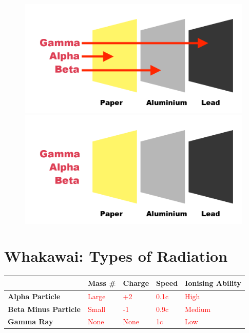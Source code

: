 \documentclass[12pt]{report}
\makeatletter
\DeclareRobustCommand{\fillinspace}[1]{%
	\ifthenelse
	{\boolean{@answer}}{\textcolor{red}{#1}}
	{\phantom{#1}}%
}
\makeatother
\begin{document}
\begin{figure}[ht]
	\centering
	{\includegraphics[width=0.9\linewidth]{radiation-penetration-answer.png}}
	{\includegraphics[width=0.9\linewidth]{radiation-penetration.png}}
\end{figure}

\section{Whakawai: Types of Radiation}


\begin{table}[ht]
	\begin{tabular}{l|l|l|p{2cm}|l|}
		\cline{2-5}
		                                                   & \textbf{Mass \#}    & \textbf{Charge}    & \textbf{Speed}     & \textbf{Ionising Ability} \\ \hline
		\multicolumn{1}{|l|}{\textbf{Alpha Particle}}      & \fillinspace{Large} & \fillinspace{+2}   & \fillinspace{0.1c} & \fillinspace{High}        \\ \hline
		\multicolumn{1}{|l|}{\textbf{Beta Minus Particle}} & \fillinspace{Small} & \fillinspace{-1}   & \fillinspace{0.9c} & \fillinspace{Medium}      \\ \hline
		\multicolumn{1}{|l|}{\textbf{Gamma Ray}}           & \fillinspace{None}  & \fillinspace{None} & \fillinspace{1c}   & \fillinspace{Low}         \\ \hline
	\end{tabular}
\end{table}
\end{document}
